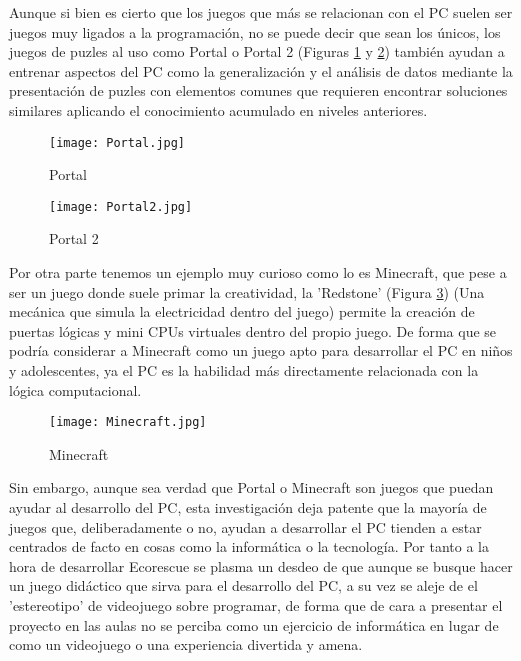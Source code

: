 Aunque si bien es cierto que los juegos que más se relacionan con el PC suelen ser juegos muy ligados a la programación, no se puede decir que sean los únicos, los juegos de puzles al uso como Portal\cite{portal} o Portal 2\cite{portal2} (Figuras \ref{fig:portal} y \ref{fig:portal2}) también ayudan a entrenar aspectos del PC como la generalización y el análisis de datos mediante la presentación de puzles con elementos comunes que requieren encontrar soluciones similares aplicando el conocimiento acumulado en niveles anteriores.

\begin{figure}[H]
    \centering
      \texttt{[image: Portal.jpg]}
    \caption{Portal}
    \label{fig:portal}
\end{figure}

\begin{figure}[H]
    \centering
      \texttt{[image: Portal2.jpg]}
    \caption{Portal 2}
    \label{fig:portal2}
\end{figure}

Por otra parte tenemos un ejemplo muy curioso como lo es Minecraft\cite{Minecraft}, que pese a ser un juego donde suele primar la creatividad, la 'Redstone' (Figura \ref{fig:minecraft}) (Una mecánica que simula la electricidad dentro del juego) permite la creación de puertas lógicas y mini CPUs virtuales dentro del propio juego. De forma que se podría considerar a Minecraft como un juego apto para desarrollar el PC en niños y adolescentes, ya el PC es la habilidad más directamente relacionada con la lógica computacional.

\begin{figure}[H]
    \centering
      \texttt{[image: Minecraft.jpg]}
    \caption{Minecraft}
    \label{fig:minecraft}
\end{figure}


Sin embargo, aunque sea verdad que Portal o Minecraft son juegos que puedan ayudar al desarrollo del PC, esta investigación deja patente que la mayoría de juegos que, deliberadamente o no, ayudan a desarrollar el PC tienden a estar centrados de facto en cosas como la informática o la tecnología. Por tanto a la hora de desarrollar Ecorescue se plasma un desdeo de que aunque se busque hacer un juego didáctico que sirva para el desarrollo del PC, a su vez se aleje de el 'estereotipo' de videojuego sobre programar, de forma que de cara a presentar el proyecto en las aulas no se perciba como un ejercicio de informática en lugar de como un videojuego o una experiencia divertida y amena.